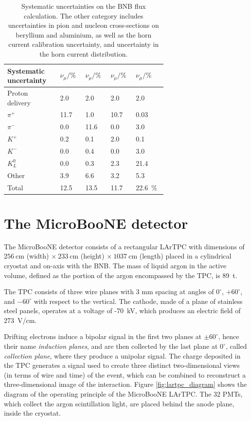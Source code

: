 \begin{table}[htbp]
   \centering
     \caption{Systematic uncertainties on the BNB flux calculation. The other category includes uncertainties in pion and nucleon cross-sections on beryllium and aluminium, as well as the horn current calibration uncertainty, and uncertainty in the horn current distribution.}
   \begin{tabular}{p{0.25\linewidth}p{0.1\linewidth}p{0.1\linewidth}p{0.1\linewidth}p{0.1\linewidth}}
     \toprule
     Systematic uncertainty & $\nu_{\mu}/\%$ & $\nu_{\mu}/\%$ & $\nu_{\mu}/\%$ & $\nu_{\mu}/\%$ \\
     \midrule
     Proton delivery & 2.0 & 2.0 & 2.0 & 2.0 \\
     $\pi^+$ & 11.7 & 1.0 & 10.7 & 0.03 \\ 
     $\pi^-$ & 0.0 & 11.6 & 0.0 & 3.0 \\
     $K^+$ & 0.2 & 0.1 & 2.0 & 0.1 \\
     $K^-$ & 0.0 & 0.4 & 0.0 & 3.0 \\
     $K^0_L$ & 0.0 & 0.3 & 2.3 & 21.4 \\
     Other & 3.9 & 6.6 & 3.2 & 5.3 \\
     \midrule
     Total & 12.5 & 13.5 & 11.7 & 22.6~\%\\
     \bottomrule
   \end{tabular}
\label{tab:flux_syst}
\end{table}

\section{The MicroBooNE detector}\label{sec:detector}
The MicroBooNE detector consists of a rectangular LArTPC with
dimensions of $256~$cm (width) $\times~233~$cm (height) $\times~1037~$cm (length) placed in a cylindrical cryostat and on-axis with the BNB. The mass of liquid argon in the active volume, defined as the portion of the argon encompassed by the TPC, is 89~t. 

The TPC consists of three wire planes with 3 mm spacing at angles of $0^{\circ}$, $+60^{\circ}$, and $-60^{\circ}$ with respect to the vertical. The cathode, made of a plane of stainless steel panels, operates at a voltage of -70~kV, which produces an electric field of 273~V/cm.

Drifting electrons induce a bipolar signal in the first two planes at $\pm60^{\circ}$, hence their name \emph{induction planes}, and are then collected by the last plane at $0^{\circ}$, called \emph{collection plane}, where they produce a unipolar signal. The charge deposited in the TPC generates a signal used to create three distinct two-dimensional views (in terms of wire and time) of the event, which can be combined to reconstruct a three-dimensional image of the interaction. Figure \ref{fig:lartpc_diagram} shows the diagram of the operating principle of the MicroBooNE LArTPC.
The 32 PMTs, which collect the argon scintillation light, are placed behind the anode plane, inside the cryostat.


